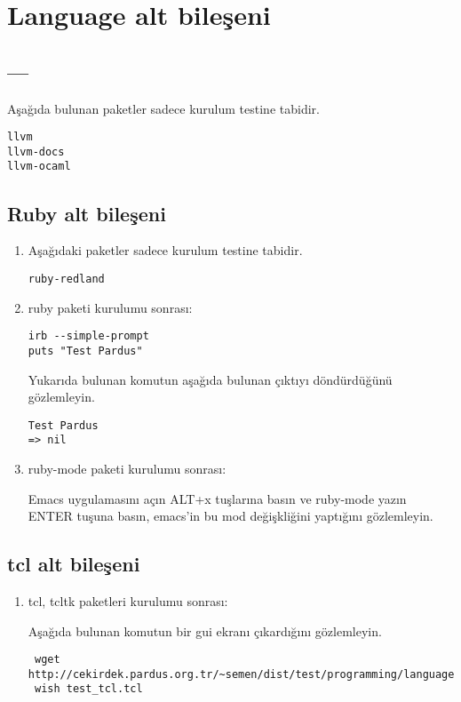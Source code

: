 \documentclass[a4paper,10pt]{article}
\begin{document}
\section{Language alt bileşeni}

\subsection{---}
\item Aşağıda bulunan paketler sadece kurulum testine tabidir.

\begin{verbatim}
llvm
llvm-docs
llvm-ocaml
\end{verbatim}

\subsection{Ruby alt bileşeni}

\begin{enumerate}
\item Aşağıdaki paketler sadece kurulum testine tabidir.
\begin{verbatim}
ruby-redland
\end{verbatim}


 \item ruby paketi kurulumu sonrası:

\begin{verbatim}
irb --simple-prompt 
puts "Test Pardus"
\end{verbatim}

Yukarıda bulunan komutun aşağıda bulunan çıktıyı döndürdüğünü gözlemleyin.
\begin{verbatim}
Test Pardus
=> nil
\end{verbatim}

\item ruby-mode paketi kurulumu sonrası:

Emacs uygulamasını açın ALT+x tuşlarına basın ve ruby-mode yazın ENTER tuşuna basın, emacs'in bu mod değişkliğini yaptığını gözlemleyin.
\end{enumerate}

\subsection{tcl alt bileşeni}

\begin{enumerate}
 \item tcl, tcltk paketleri kurulumu sonrası:

Aşağıda bulunan komutun bir gui ekranı çıkardığını gözlemleyin.
\begin{verbatim}
 wget http://cekirdek.pardus.org.tr/~semen/dist/test/programming/language/test_tcl.tcl
 wish test_tcl.tcl
\end{verbatim}


\end{enumerate}
\end{document}
